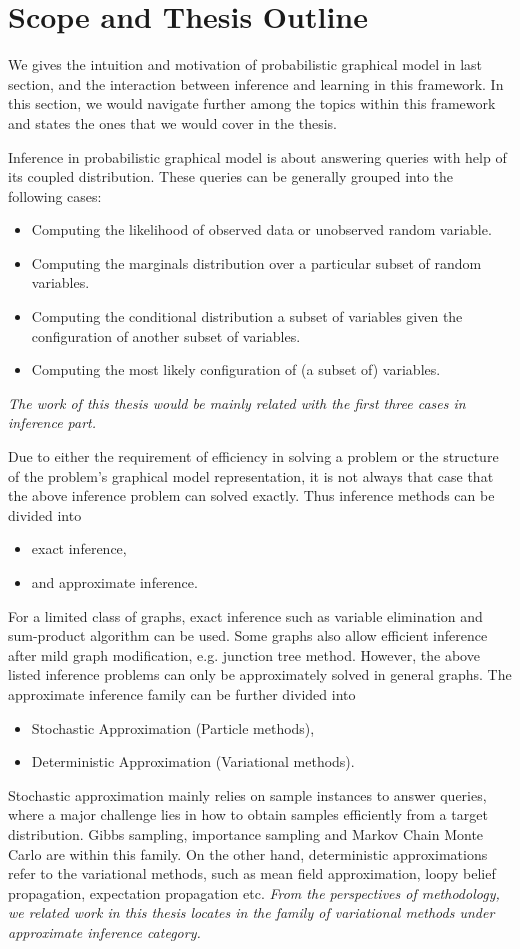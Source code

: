 \section{Scope and Thesis Outline}\label{chpt1:sec:scope-outline}
We gives the intuition and motivation of probabilistic graphical model in last section, and the interaction between inference and learning in this framework. In this section, we would navigate further among the topics within this framework and states the ones that we would cover in the thesis.

Inference in probabilistic graphical model is about answering queries with help of its coupled distribution. These queries can be generally grouped into the following cases:
\begin{itemize}
\item Computing the likelihood of observed data or unobserved random variable.
\item Computing the marginals distribution over a particular subset of random variables.
\item Computing the conditional distribution a subset of variables given the configuration of another subset of variables. 
\item Computing the most likely configuration of (a subset of) variables.
\end{itemize}
\textit{The work of this thesis would be mainly related with the first three cases in inference part.}


Due to either the requirement of efficiency in solving a problem or the structure of the problem's graphical model representation, it is not always that case that the above inference problem can solved exactly. Thus inference methods can be divided into
\begin{itemize}
\item exact inference,
\item and approximate inference.
\end{itemize}
For a limited class of graphs, exact inference such as variable elimination and sum-product algorithm can be used. Some graphs also allow efficient inference after mild graph modification, e.g. junction tree method. However, the above listed inference problems can only be approximately solved in general graphs. The approximate inference family can be further divided into
\begin{itemize}
\item Stochastic Approximation (Particle methods),
\item Deterministic Approximation (Variational methods).
\end{itemize}
Stochastic approximation mainly relies on sample instances to answer queries, where a major challenge lies in how to obtain samples efficiently from a target distribution. Gibbs sampling, importance sampling and Markov Chain Monte Carlo are within this family. On the other hand, deterministic approximations refer to the variational methods, such as mean field approximation, loopy belief propagation, expectation propagation etc. \textit{From the perspectives of methodology, we related work in this thesis locates in the family of variational methods under approximate inference category.}


